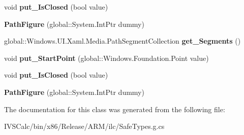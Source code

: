 \begin{DoxyCompactItemize}
void {\bfseries put\+\_\+\+Is\+Closed} (bool value)
\item 
\mbox{\label{class_windows_1_1_u_i_1_1_xaml_1_1_media_1_1_path_figure_abe2e7b79407ea8e704a56a4bb2d8ecf2}} 
{\bfseries Path\+Figure} (global\+::\+System.\+Int\+Ptr dummy)
\item 
\mbox{\label{class_windows_1_1_u_i_1_1_xaml_1_1_media_1_1_path_figure_a55e9274133a7e70428e1a1774744c831}} 
global\+::\+Windows.\+U\+I.\+Xaml.\+Media.\+Path\+Segment\+Collection {\bfseries get\+\_\+\+Segments} ()
\item 
\mbox{\label{class_windows_1_1_u_i_1_1_xaml_1_1_media_1_1_path_figure_a98a6c923093988529a0c002b45fcc964}} 
void {\bfseries put\+\_\+\+Start\+Point} (global\+::\+Windows.\+Foundation.\+Point value)
\item 
\mbox{\label{class_windows_1_1_u_i_1_1_xaml_1_1_media_1_1_path_figure_a7f73c57c9048ef1ca00f9c30c01a6267}} 
void {\bfseries put\+\_\+\+Is\+Closed} (bool value)
\item 
\mbox{\label{class_windows_1_1_u_i_1_1_xaml_1_1_media_1_1_path_figure_abe2e7b79407ea8e704a56a4bb2d8ecf2}} 
{\bfseries Path\+Figure} (global\+::\+System.\+Int\+Ptr dummy)
\end{DoxyCompactItemize}


The documentation for this class was generated from the following file\+:\begin{DoxyCompactItemize}
\item 
I\+V\+S\+Calc/bin/x86/\+Release/\+A\+R\+M/ilc/Safe\+Types.\+g.\+cs\end{DoxyCompactItemize}
